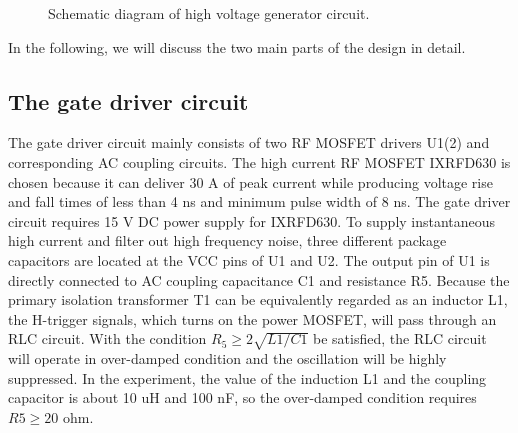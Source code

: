 \documentclass[aip,rsi,reprint,graphicx]{revtex4-1} %
\begin{document}
\begin{figure}[hbt]
\caption{Schematic diagram of high voltage generator circuit.\label{Fig1}}%
\end{figure}

In the following, we will discuss the two main parts of the design in detail.

\subsection{The gate driver circuit}
The gate driver circuit mainly consists of two RF MOSFET drivers U1(2) and corresponding AC coupling circuits.
 The high current RF MOSFET IXRFD630 is chosen because it can deliver 30 A of peak current while producing voltage rise and fall times of less than 4 ns and minimum pulse width of 8 ns.
 The gate driver circuit requires 15 V DC power supply for IXRFD630.
 To supply instantaneous high current and filter out high frequency noise, three different package capacitors are located at the VCC pins of U1 and U2.
	The output pin of U1 is directly connected to AC coupling capacitance C1 and resistance R5. Because the primary isolation transformer T1 can be equivalently regarded as an inductor L1, the H-trigger signals, which turns on the power MOSFET, will pass through an RLC circuit. With the condition $R_5\ge2\sqrt{L1/C1}$ be satisfied, the RLC circuit will operate in over-damped condition and the oscillation will be highly suppressed. In the experiment, the value of the induction L1 and the coupling capacitor is about 10 uH and 100 nF, so the over-damped condition requires $R5\ge20$ ohm.

\end{document}
